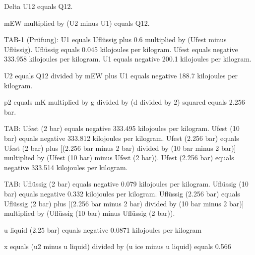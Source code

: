 Delta U12 equals Q12.  

mEW multiplied by (U2 minus U1) equals Q12.  

TAB-1 (Prüfung):  
U1 equals Uflüssig plus 0.6 multiplied by (Ufest minus Uflüssig).  
Uflüssig equals 0.045 kilojoules per kilogram.  
Ufest equals negative 333.958 kilojoules per kilogram.  
U1 equals negative 200.1 kilojoules per kilogram.  

U2 equals Q12 divided by mEW plus U1 equals negative 188.7 kilojoules per kilogram.  

p2 equals mK multiplied by g divided by (d divided by 2) squared equals 2.256 bar.  

TAB:  
Ufest (2 bar) equals negative 333.495 kilojoules per kilogram.  
Ufest (10 bar) equals negative 333.812 kilojoules per kilogram.  
Ufest (2.256 bar) equals Ufest (2 bar) plus [(2.256 bar minus 2 bar) divided by (10 bar minus 2 bar)] multiplied by (Ufest (10 bar) minus Ufest (2 bar)).  
Ufest (2.256 bar) equals negative 333.514 kilojoules per kilogram.  

TAB:  
Uflüssig (2 bar) equals negative 0.079 kilojoules per kilogram.  
Uflüssig (10 bar) equals negative 0.332 kilojoules per kilogram.  
Uflüssig (2.256 bar) equals Uflüssig (2 bar) plus [(2.256 bar minus 2 bar) divided by (10 bar minus 2 bar)] multiplied by (Uflüssig (10 bar) minus Uflüssig (2 bar)).

u liquid (2.25 bar) equals negative 0.0871 kilojoules per kilogram  

x equals (u2 minus u liquid) divided by (u ice minus u liquid) equals 0.566